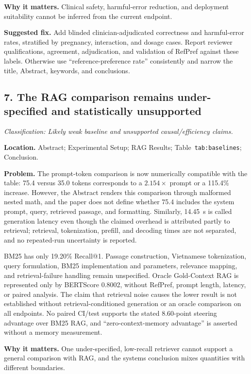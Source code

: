 \documentclass[11pt]{article}
\newcommand{\findinglabel}[1]{\textbf{#1}}
\newcommand{\classification}[1]{\textit{Classification: #1.}}
\begin{document}
\findinglabel{Why it matters.} Clinical safety, harmful-error reduction, and deployment suitability cannot be inferred from the current endpoint.

\findinglabel{Suggested fix.} Add blinded clinician-adjudicated correctness and harmful-error rates, stratified by pregnancy, interaction, and dosage cases.  Report reviewer qualifications, agreement, adjudication, and validation of RefPref against these labels.  Otherwise use ``reference-preference rate'' consistently and narrow the title, Abstract, keywords, and conclusions.

\subsection*{7. The RAG comparison remains under-specified and statistically unsupported}

\classification{Likely weak baseline and unsupported causal/efficiency claims}

\findinglabel{Location.} Abstract; Experimental Setup; RAG Results; Table~\texttt{tab:baselines}; Conclusion.

\findinglabel{Problem.} The prompt-token comparison is now numerically compatible with the table: 75.4 versus 35.0 tokens corresponds to a $2.154\times$ prompt or a 115.4\% increase.  However, the Abstract renders this comparison through malformed nested math, and the paper does not define whether 75.4 includes the system prompt, query, retrieved passage, and formatting.  Similarly, 14.45~s is called generation latency even though the claimed overhead is attributed partly to retrieval; retrieval, tokenization, prefill, and decoding times are not separated, and no repeated-run uncertainty is reported.

BM25 has only 19.20\% Recall@1.  Passage construction, Vietnamese tokenization, query formulation, BM25 implementation and parameters, relevance mapping, and retrieval-failure handling remain unspecified.  Oracle Gold-Context RAG is represented only by BERTScore 0.8002, without RefPref, prompt length, latency, or paired analysis.  The claim that retrieval noise causes the lower result is not established without retrieval-conditioned generation or an oracle comparison on all endpoints.  No paired CI/test supports the stated 8.60-point steering advantage over BM25 RAG, and ``zero-context-memory advantage'' is asserted without a memory measurement.

\findinglabel{Why it matters.} One under-specified, low-recall retriever cannot support a general comparison with RAG, and the systems conclusion mixes quantities with different boundaries.
\end{document}
